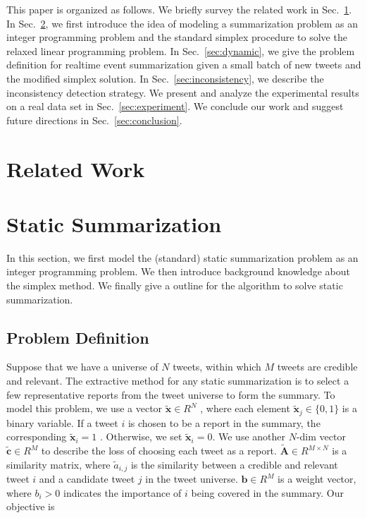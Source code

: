 \documentclass{llncs}
\begin{document}
This paper is organized as follows. We briefly survey the related work in Sec.~\ref{sec:related}. In Sec.~\ref{sec:static}, we first introduce the idea of modeling a summarization problem as an integer programming problem and the standard simplex procedure to solve the relaxed linear programming problem. In Sec.~\ref{sec:dynamic}, we give the problem definition for realtime event summarization given a small batch of new tweets and the modified simplex solution. In Sec.~\ref{sec:inconsistency}, we describe the inconsistency detection strategy. We present and analyze the experimental results on a real data set in Sec.~\ref{sec:experiment}. We conclude our work and suggest future directions in Sec.~\ref{sec:conclusion}.

\section{Related Work}\label{sec:related}



\section{Static Summarization}\label{sec:static}
In this section, we first model the (standard) static summarization problem as an integer programming problem. We then introduce background knowledge about the simplex method. We finally give a outline for the algorithm to solve static summarization.
\subsection{Problem Definition}
Suppose that we have a universe of $N$ tweets, within which $M$ tweets are credible and relevant. The extractive method for any static summarization is to select a few representative reports from the tweet universe to form the summary. To model this problem, we use a vector $\tilde{\mathbf{x}}\in R^N$ , where each element $\tilde{\mathbf{x}}_j\in \{0,1\}$ is a binary variable. If a tweet $i$ is chosen to be a report in the summary, the corresponding $\tilde{\mathbf{x}}_i=1$ . Otherwise, we set  $\tilde{\mathbf{x}}_i=0$. We use another $N$-dim vector $\tilde{\mathbf{c}}\in R^M$ to describe the loss of choosing each tweet as a report. $\tilde{\mathbf{A}}\in R^{M\times N}$  is a similarity matrix, where $\tilde{a}_{i,j}$  is the similarity between a credible and relevant tweet $i$ and a candidate tweet $j$ in the tweet universe. $\mathbf{b}\in R^{M}$ is a weight vector, where $b_{i}>0$ indicates the importance of $i$ being covered in the summary. Our objective is
\end{document}
